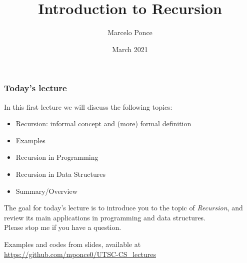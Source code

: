


\title[Recursion]{\titlestyle Introduction to Recursion}
\author[M.Ponce]{Marcelo Ponce}
\date{March 2021}




\begin{frame}
  \titlepage
\end{frame}




\begin{frame}
  \frametitle{Today's lecture}

  \vspace{-0.2cm}
  
  \begin{beamerboxesrounded}{In this first lecture we will discuss the following topics:}
  \begin{itemize}
  \item Recursion: informal concept and (more) formal definition
  \item Examples
  \item Recursion in Programming
  \item Recursion in Data Structures
  \item Summary/Overview
  \end{itemize}
  \end{beamerboxesrounded}

  \vspace{-1mm}
  The goal for today's lecture is to introduce you to the topic of \emph{Recursion},
  and review its main applications in programming and data structures. 
  \\
  Please stop me if you have a question.

  \vspace{2.5mm}
  \begin{small}
  \begin{beamerboxesrounded}[upper=upcol,lower=lowcol,shadow=true]{Examples and codes from slides, available at}
        \centering
        \url{https://github.com/mponce0/UTSC-CS_lectures}
  \end{beamerboxesrounded}
  \end{small}
\end{frame}




